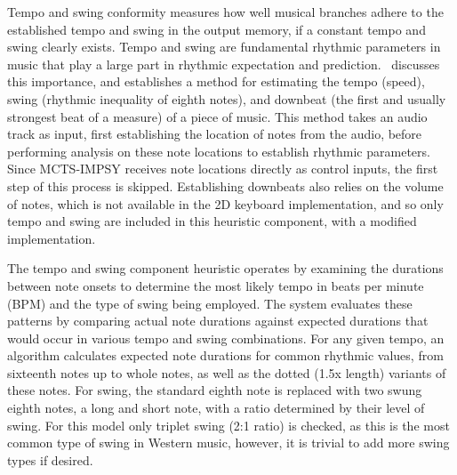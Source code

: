 Tempo and swing conformity measures how well musical branches adhere to the established tempo and swing in the output memory, if a constant tempo and swing clearly exists. Tempo and swing are fundamental rhythmic parameters in music that play a large part in rhythmic expectation and prediction.~\cite{Laroche2001TempoEstimation} discusses this importance, and establishes a method for estimating the tempo (speed), swing (rhythmic inequality of eighth notes), and downbeat (the first and usually strongest beat of a measure) of a piece of music. This method takes an audio track as input, first establishing the location of notes from the audio, before performing analysis on these note locations to establish rhythmic parameters. Since MCTS-IMPSY receives note locations directly as control inputs, the first step of this process is skipped. Establishing downbeats also relies on the volume of notes, which is not available in the 2D keyboard implementation, and so only tempo and swing are included in this heuristic component, with a modified implementation.

The tempo and swing component heuristic operates by examining the durations between note onsets to determine the most likely tempo in beats per minute (BPM) and the type of swing being employed. The system evaluates these patterns by comparing actual note durations against expected durations that would occur in various tempo and swing combinations. For any given tempo, an algorithm calculates expected note durations for common rhythmic values, from sixteenth notes up to whole notes, as well as the dotted (1.5x length) variants of these notes. For swing, the standard eighth note is replaced with two swung eighth notes, a long and short note, with a ratio determined by their level of swing. For this model only triplet swing (2:1 ratio) is checked, as this is the most common type of swing in Western music, however, it is trivial to add more swing types if desired.

